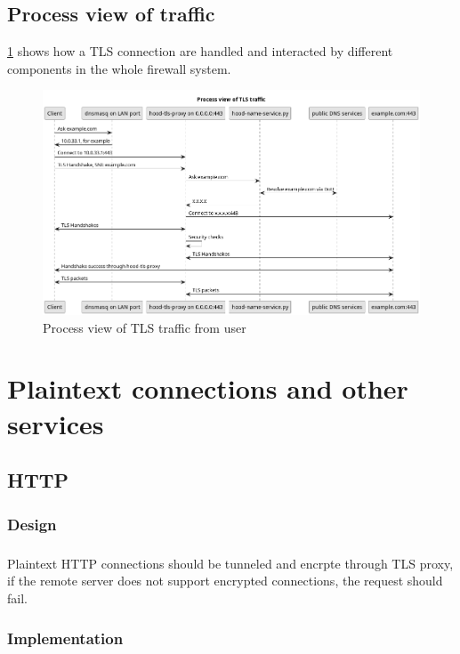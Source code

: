 \documentclass[mscthesis]{usiinfthesis}
\begin{document}
\section{Process view of traffic}
\cref{fig:tls-process-view} shows how a TLS connection are handled and interacted by different components in the whole firewall system.
\begin{figure}[H]
  \includegraphics[width=\textheight, angle=90]{graphics/puml/process-tls-traffic.png}
  \caption{Process view of TLS traffic from user}
  \label{fig:tls-process-view}
\end{figure}

\chapter{Plaintext connections and other services}\label{cha:plaintext}

\section{HTTP}
\subsection{Design}
\paragraph{}
Plaintext HTTP connections should be tunneled and encrpte through TLS proxy, if the remote server does not support encrypted connections, the request should fail.
\subsection{Implementation}
\end{document}

